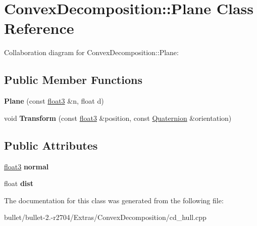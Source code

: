 \hypertarget{class_convex_decomposition_1_1_plane}{\section{Convex\+Decomposition\+:\+:Plane Class Reference}
\label{class_convex_decomposition_1_1_plane}
}


Collaboration diagram for Convex\+Decomposition\+:\+:Plane\+:
\subsection*{Public Member Functions}
\begin{DoxyCompactItemize}
\item 
\hypertarget{class_convex_decomposition_1_1_plane_a5db1cf8d493ed38c34e6b89ce3fecca6}{{\bfseries Plane} (const \hyperlink{class_convex_decomposition_1_1float3}{float3} \&n, float d)}\label{class_convex_decomposition_1_1_plane_a5db1cf8d493ed38c34e6b89ce3fecca6}

\item 
\hypertarget{class_convex_decomposition_1_1_plane_ad070cb4dfe930c6a154fe7f7bce758df}{void {\bfseries Transform} (const \hyperlink{class_convex_decomposition_1_1float3}{float3} \&position, const \hyperlink{class_convex_decomposition_1_1_quaternion}{Quaternion} \&orientation)}\label{class_convex_decomposition_1_1_plane_ad070cb4dfe930c6a154fe7f7bce758df}

\end{DoxyCompactItemize}
\subsection*{Public Attributes}
\begin{DoxyCompactItemize}
\item 
\hypertarget{class_convex_decomposition_1_1_plane_ade6d872454ba11fb09dab94c36e34ea0}{\hyperlink{class_convex_decomposition_1_1float3}{float3} {\bfseries normal}}\label{class_convex_decomposition_1_1_plane_ade6d872454ba11fb09dab94c36e34ea0}

\item 
\hypertarget{class_convex_decomposition_1_1_plane_a6c0a5f144c63144fe018aa7694693d9b}{float {\bfseries dist}}\label{class_convex_decomposition_1_1_plane_a6c0a5f144c63144fe018aa7694693d9b}

\end{DoxyCompactItemize}


The documentation for this class was generated from the following file\+:\begin{DoxyCompactItemize}
\item 
bullet/bullet-\/2.-\/r2704/\+Extras/\+Convex\+Decomposition/cd\+\_\+hull.\+cpp\end{DoxyCompactItemize}
